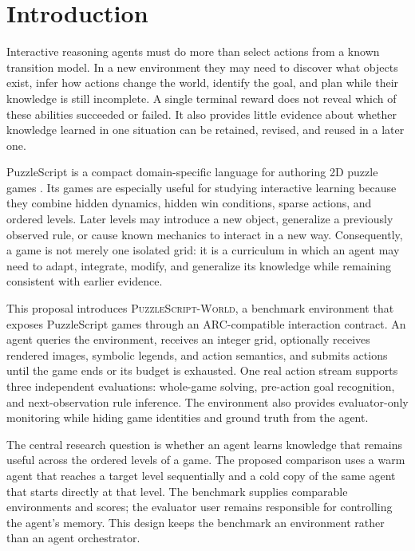 \documentclass[a4paper,11pt]{article}
\newcommand{\benchmarkname}{\textsc{PuzzleScript-World}}
\begin{document}
\section{Introduction}

Interactive reasoning agents must do more than select actions from a known
transition model. In a new environment they may need to discover what objects
exist, infer how actions change the world, identify the goal, and plan while
their knowledge is still incomplete. A single terminal reward does not reveal
which of these abilities succeeded or failed. It also provides little evidence
about whether knowledge learned in one situation can be retained, revised, and
reused in a later one.

PuzzleScript is a compact domain-specific language for authoring 2D
puzzle games \cite{lavelle2013puzzlescript}. Its games are especially useful for
studying interactive learning because they combine hidden dynamics, hidden win
conditions, sparse actions, and ordered levels. Later levels may introduce a new
object, generalize a previously observed rule, or cause known mechanics to
interact in a new way. Consequently, a game is not merely one isolated grid: it
is a curriculum in which an agent may need to adapt, integrate, modify, and
generalize its knowledge while remaining consistent with earlier evidence.

This proposal introduces \benchmarkname, a benchmark environment that exposes
PuzzleScript games through an ARC-compatible interaction contract. An agent
queries the environment, receives an integer grid, optionally receives rendered
images, symbolic legends, and action semantics, and submits actions until the
game ends or its budget is exhausted. One real action stream supports three
independent evaluations: whole-game solving, pre-action goal recognition, and
next-observation rule inference. The environment also provides evaluator-only
monitoring while hiding game identities and ground truth from the agent.

The central research question is whether an agent learns knowledge that remains
useful across the ordered levels of a game. The proposed comparison uses a warm
agent that reaches a target level sequentially and a cold copy of the same agent
that starts directly at that level. The benchmark supplies comparable
environments and scores; the evaluator user remains responsible for controlling
the agent's memory. This design keeps the benchmark an environment rather than
an agent orchestrator.
\end{document}

